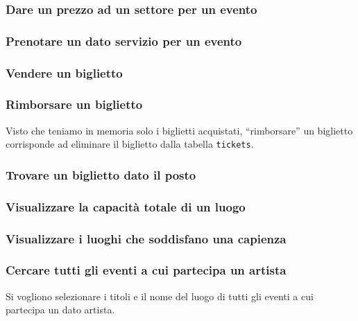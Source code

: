 \documentclass[a4paper,11pt]{article}
\begin{document}
\subsubsection{Dare un prezzo ad un settore per un evento}


\subsubsection{Prenotare un dato servizio per un evento}


\subsubsection{Vendere un biglietto}


\subsubsection{Rimborsare un biglietto}
Visto che teniamo in memoria solo i biglietti acquistati, ``rimborsare'' un
biglietto corrisponde ad eliminare il biglietto dalla tabella \texttt{tickets}.


\subsubsection{Trovare un biglietto dato il posto}


\subsubsection{Visualizzare la capacità totale di un luogo}


\subsubsection{Visualizzare i luoghi che soddisfano una capienza}


\subsubsection{Cercare tutti gli eventi a cui partecipa un artista}
Si vogliono selezionare i titoli e il nome del luogo di tutti gli eventi a cui
partecipa un dato artista.

\end{document}
